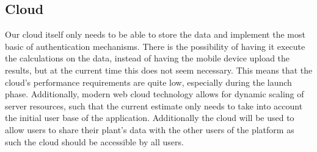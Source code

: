 \subsection{Cloud}
Our cloud itself only needs to be able to store the data and implement the most
basic of authentication mechanisms. There is the possibility of having it execute
the calculations on the data, instead of having the mobile device upload the results,
but at the current time this does not seem necessary. This means that the cloud's
performance requirements are quite low, especially during the launch phase. Additionally,
modern web cloud technology allows for dynamic scaling of server resources, such
that the current estimate only needs to take into account the initial user base
of the application. Additionally the cloud will be used to allow users to share their plant's data with the other users of the platform as such the cloud should be accessible by all users.